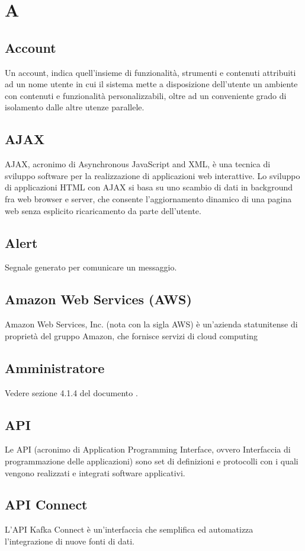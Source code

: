 
\newpage \section{A}
\subsection{Account}  Un account, indica quell'insieme di funzionalità, strumenti e contenuti attribuiti ad un nome utente in cui il sistema mette a disposizione dell'utente un ambiente con contenuti e funzionalità personalizzabili, oltre ad un conveniente grado di isolamento dalle altre utenze parallele.
\subsection{AJAX}  AJAX, acronimo di Asynchronous JavaScript and XML, è una tecnica di sviluppo software per la realizzazione di applicazioni web interattive. Lo sviluppo di applicazioni HTML con AJAX si basa su uno scambio di dati in background fra web browser e server, che consente l'aggiornamento dinamico di una pagina web senza esplicito ricaricamento da parte dell'utente.
\subsection{Alert}  Segnale generato per comunicare un messaggio.
\subsection{Amazon Web Services (AWS)}  Amazon Web Services, Inc. (nota con la sigla AWS) è un'azienda statunitense di proprietà del gruppo Amazon, che fornisce servizi di cloud computing
\subsection{Amministratore}  Vedere sezione 4.1.4 del documento .
\subsection{API}  Le API (acronimo di Application Programming Interface, ovvero Interfaccia di programmazione delle applicazioni) sono set di definizioni e protocolli con i quali vengono realizzati e integrati software applicativi.
\subsection{API Connect}  L'API Kafka Connect è un'interfaccia che semplifica ed automatizza l'integrazione di nuove fonti di dati.
